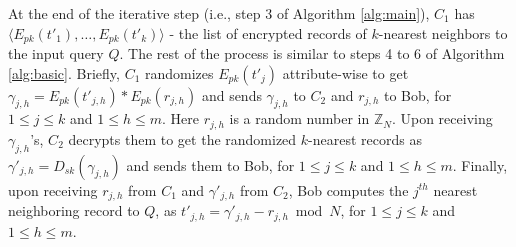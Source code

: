 \documentclass{article}
\begin{document}
At the end of the iterative step (i.e., step 3 of Algorithm \ref{alg:main}), 
$C_1$ has $\langle E_{pk}(t'_1), \ldots, E_{pk}(t'_k)\rangle$ - the list of encrypted 
records of $k$-nearest neighbors to the input query $Q$. The rest of the process is similar to 
steps 4 to 6 of Algorithm \ref{alg:basic}. Briefly, $C_1$ randomizes $E_{pk}(t'_j)$ attribute-wise 
to get $\gamma_{j,h} = E_{pk}(t'_{j,h})* E_{pk}(r_{j,h})$ and sends $\gamma_{j,h}$ to $C_2$ and $r_{j,h}$ to Bob, 
for $1 \le j \le k$ and $1 \le h \le m$. 
Here $r_{j,h}$ is a random number in $\mathbb{Z}_N$. Upon receiving $\gamma_{j,h}$'s, $C_2$ decrypts 
them to get the randomized $k$-nearest records as $\gamma'_{j,h} = 
D_{sk}(\gamma_{j,h})$ and sends them to Bob, for $1 \le j \le k$ and $1 \le h \le m$. 
Finally, upon receiving $r_{j,h}$ from $C_1$ and $\gamma'_{j,h}$ from $C_2$, 
Bob computes the $j^{th}$ nearest 
neighboring record to $Q$, as $t'_{j,h} = \gamma'_{j,h} - r_{j,h} \bmod N$, for $1 \le j \le k$ and $1 \le h \le m$.
\end{document}
